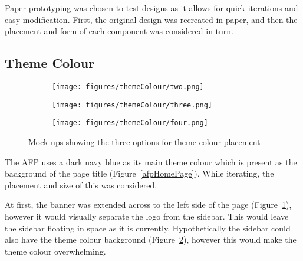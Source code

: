 \documentclass[bsc,frontabs,oneside,singlespacing,parskip,deptreport,logo]{infthesis}
\begin{document}
Paper prototyping was chosen to test designs as it allows for quick iterations and easy modification. First, the original design was recreated in paper, and then the placement and form of each component was considered in turn.

\subsection{Theme Colour}

\begin{figure}[h]
\centering
\begin{subfigure}{.3\textwidth}
    \centering
    \texttt{[image: figures/themeColour/two.png]}
    \caption{}
    \label{theme-1}
\end{subfigure}
\begin{subfigure}{.3\textwidth}
    \centering
    \texttt{[image: figures/themeColour/three.png]}
    \caption{}
    \label{theme-2}
\end{subfigure}%
\begin{subfigure}{.3\textwidth}
    \centering
    \texttt{[image: figures/themeColour/four.png]}
    \caption{}
    \label{theme-3}
\end{subfigure}
\caption[short]{Mock-ups showing the three options for theme colour placement}
\end{figure}


The AFP uses a dark navy blue as its main theme colour which is present as the background of the page title (Figure~\ref{afpHomePage}). While iterating, the placement and size of this was considered.


At first, the banner was extended across to the left side of the page (Figure~\ref{theme-1}), however it would visually separate the logo from the sidebar. This would leave the sidebar floating in space as it is currently. Hypothetically the sidebar could also have the theme colour background (Figure~\ref{theme-2}), however this would make the theme colour overwhelming.
\end{document}
